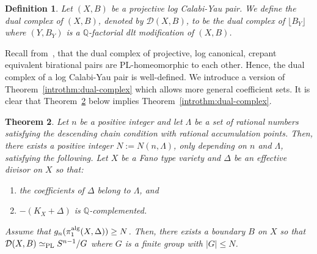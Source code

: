\documentclass{amsart}
\renewcommand{\qq}{\mathbb{Q}}
\newtheorem{theorem}{Theorem}[section]
\newtheorem{definition}[theorem]{Definition}
\theoremstyle{remark}
\numberwithin{equation}{section}
\begin{document}
\begin{definition}{\em 
Let $(X,B)$ be a projective log Calabi-Yau pair.
We define the {\em dual complex} of $(X,B)$,
denoted by $\mathcal{D}(X,B)$, to be the dual complex
of $\lfloor B_Y\rfloor$ where $(Y,B_Y)$ is a
$\qq$-factorial dlt modification of $(X,B)$.
}
\end{definition}

Recall from~\cite{dFKX17}, that the dual complex of projective, 
log canonical, crepant equivalent  birational pairs are PL-homeomorphic to each other. Hence, the dual complex of a log Calabi-Yau pair is well-defined.
We introduce a version of Theorem~\ref{introthm:dual-complex} which allows more general coefficient sets.
It is clear that 
Theorem~\ref{thm:dual-complex-general-cOeff} below implies 
Theorem~\ref{introthm:dual-complex}.

\begin{theorem}\label{thm:dual-complex-general-cOeff}
Let $n$ be a positive integer and let $\Lambda$ be a set of rational numbers satisfying the descending chain condition
with rational accumulation points.
Then, there exists a positive integer $N:=N(n,\Lambda)$, only depending on $n$ and $\Lambda$, satisfying the following.
Let $X$ be a Fano type variety and
$\Delta$ be an effective divisor on $X$ so that:
\begin{enumerate}
\item the coefficients of $\Delta$ belong to $\Lambda$, and
\item $-(K_X+\Delta)$ is $\qq$-complemented.
\end{enumerate}
Assume that
$g_n(\pi_1^{\rm alg}(X,\Delta))\geq N$.
Then, there exists a boundary $B$ on $X$
so that
$\mathcal{D}(X,B)\simeq_{\rm PL} S^{n-1}/G$
where $G$ is a finite group with $|G|\leq N$.
\end{theorem}
\end{document}

